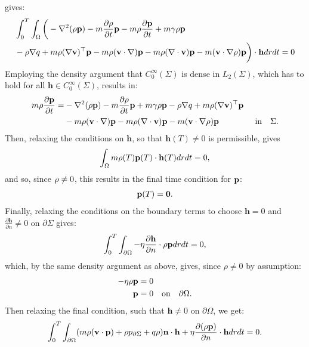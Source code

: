 gives:
\begin{align*}
&\int_0^T \int_\Omega 
\bigg( -\nabla^2 (\rho \mathbf{p}) - m \frac{\partial \rho}{\partial t} \mathbf{p}  -  m\rho \frac{\partial \mathbf{p}}{\partial t} +m \gamma \rho \mathbf{p}\\
&-\rho\nabla q +m \rho (\nabla \mathbf{v})^\top\mathbf{p} 
-m \rho (\mathbf{v} \cdot \nabla)\mathbf{p} - m \rho (\nabla \cdot \mathbf{v})\mathbf{p}  - m (\mathbf{v} \cdot \nabla \rho)\mathbf{p}  \bigg)\cdot  \mathbf{h} drdt = 0
\end{align*}
Employing the density argument that $C_0^\infty(\Sigma)$ is dense in $L_2(\Sigma)$, which has to hold for all $\mathbf{h}\in C_0^\infty(\Sigma)$, results in:
\begin{align*}
  m\rho \frac{\partial \mathbf{p}}{\partial t} =& -\nabla^2 (\rho \mathbf{p}) - m \frac{\partial \rho}{\partial t} \mathbf{p}   +m \gamma \rho \mathbf{p}-\rho\nabla q +m \rho (\nabla \mathbf{v})^\top\mathbf{p} \\
&-m \rho (\mathbf{v} \cdot \nabla)\mathbf{p} - m \rho (\nabla \cdot \mathbf{v})\mathbf{p}  - m (\mathbf{v} \cdot \nabla \rho)\mathbf{p}  \ \qquad\qquad \text{in} \quad \Sigma.
\end{align*}
Then, relaxing the conditions on $\mathbf{h}$, so that $\mathbf{h}(T) \neq 0 $ is permissible, gives
\begin{align*}
 \int_\Omega m \rho(T) \mathbf{p}(T) \cdot \mathbf{h}(T) dr dt=0,
\end{align*}
and so, since $\rho \neq 0$, this results in the final time condition for $\mathbf{p}$:
\begin{align}
\mathbf{p}(T)=\mathbf{0}.
\end{align}
Finally, relaxing the conditions on the boundary terms to choose $\mathbf{h}=0$ and $\frac{\partial \mathbf{h}}{\partial n} \neq 0$ on $\partial \Sigma$ gives:
\begin{align*}
\int_0^T \int_{\partial \Omega} - \eta \frac{\partial \mathbf{h}}{\partial n} \cdot \rho \mathbf{p} dr dt = 0,
\end{align*}
which, by the same density argument as above, gives, since $\rho \neq 0$ by assumption:
\begin{align}
\label{CondAdj1}
- \eta  \rho \mathbf{p} &= 0  \notag\\
 \mathbf{p} &= 0 \quad \text{on} \quad \partial \Omega.
\end{align}
Then relaxing the final condition, such that $\mathbf{h} \neq 0$ on $\partial \Omega$, we get:
\begin{align*}
\int_0^T \int_{\partial\Omega} ( m \rho (\mathbf{v} \cdot \mathbf{p})+\rho  {p}_{\partial \Sigma} + q \rho)  \mathbf{n}\cdot \mathbf{h}  + \eta \frac{\partial (\rho \mathbf{p})}{\partial n} \cdot \mathbf{h}dr dt=0.
\end{align*}
